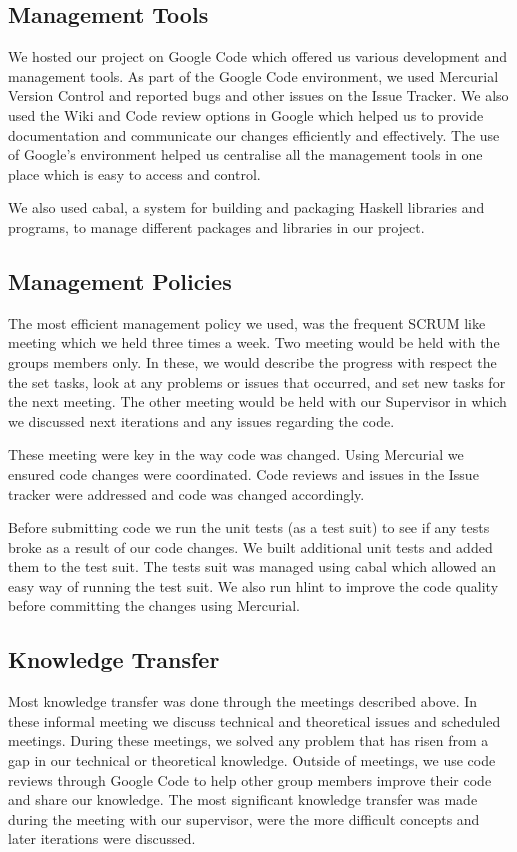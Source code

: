 \subsection*{Management Tools}

We hosted our project on Google Code which offered us various development and management tools. As part of the Google Code environment, we used Mercurial Version Control and reported bugs and other issues on the Issue Tracker. We also used the Wiki and Code review options in Google which helped us to provide documentation and communicate our changes efficiently and effectively. The use of Google's environment helped us centralise all the management tools in one place which is easy to access and control.

We also used cabal, a system for building and packaging Haskell libraries and programs, to manage different packages and libraries in our project. 

\subsection*{Management Policies}

The most efficient management policy we used, was the frequent SCRUM like meeting which we held three times a week. Two meeting would be held with the groups members only. In these, we would describe the progress with respect the the set tasks, look at any problems or issues that occurred, and set new tasks for the next meeting. The other meeting would be held with our Supervisor in which we discussed next iterations and any issues regarding the code. 

These meeting were key in the way code was changed. Using Mercurial we ensured code changes were coordinated. Code reviews and issues in the Issue tracker were addressed and code was changed accordingly. 

Before submitting code we run the unit tests (as a test suit) to see if any tests broke as a result of our code changes. We built additional unit tests and added them to the test suit. The tests suit was managed using cabal which allowed an easy way of running the test suit. We also run hlint to improve the code quality before committing the changes using Mercurial. 

\subsection*{Knowledge Transfer}

Most knowledge transfer was done through the meetings described above. In these informal meeting we discuss technical and theoretical issues
and scheduled meetings. During these meetings, we solved any problem that has risen
from a gap in our technical or theoretical knowledge. Outside of meetings, we use code
reviews through Google Code to help other group members improve their code and share
our knowledge. The most significant knowledge transfer was made during the meeting with our supervisor, were the more difficult concepts and later iterations were discussed.


